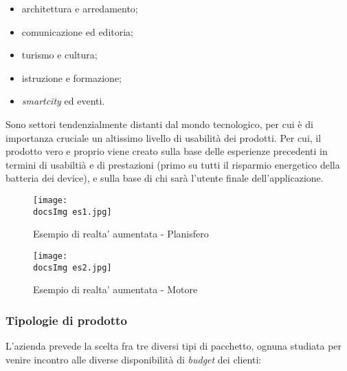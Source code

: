 \begin{itemize}
	\item architettura e arredamento;
	\item comunicazione ed editoria;
	\item turismo e cultura;
	\item istruzione e formazione;
	\item \textit{smartcity} ed eventi.
\end{itemize}

Sono settori tendenzialmente distanti dal mondo tecnologico, per cui \`e di importanza cruciale un altissimo livello di usabilit\`a dei prodotti. Per cui, il prodotto vero e proprio viene creato sulla base delle esperienze precedenti in termini di usabilti\`a e di prestazioni (primo su tutti il risparmio energetico della batteria dei device), e sulla base di chi sar\`a l'utente finale dell'applicazione.

\begin{figure}[H]
	\centering
	\texttt{[image: \\docsImg es1.jpg]}
	\caption{Esempio di realta' aumentata - Planisfero}
	\label{fig:Esempio di realta' aumentata presente nell'app Experenti - Planisfero}
\end{figure}

\begin{figure}[H]
	\centering
	\texttt{[image: \\docsImg es2.jpg]}
	\caption{Esempio di realta' aumentata - Motore}
	\label{fig:Esempio di realta' aumentata presente nell'app Experenti - Motore}
\end{figure}


\subsubsection{Tipologie di prodotto}
L'azienda prevede la scelta fra tre diversi tipi di pacchetto, ognuna studiata per venire incontro alle diverse disponibilit\`a di \textit{budget} dei clienti:

